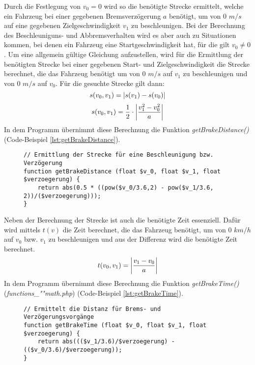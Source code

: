 Durch die Festlegung von $v_{0} = 0$ wird so die benötigte Strecke ermittelt, welche ein Fahrzeug bei einer gegebenen Bremsverzögerung $a$ benötigt, um von 0 $m/s$ auf eine gegebenen Zielgeschwindigkeit $v_{1}$ zu beschleunigen. Bei der Berechnung des Beschleuniguns- und Abbremsverhalten wird es aber auch zu Situationen kommen, bei denen ein Fahrzeug eine Startgeschwindigkeit hat, für die gilt $v_{0} \neq 0$. Um eine allgemein gültige Gleichung aufzustellen, wird für die Ermittlung der benötigten Strecke bei einer gegebenen Start- und Zielgeschwindigkeit die Strecke berechnet, die das Fahrzeug benötigt um von 0 $m/s$ auf $v_{1}$ zu beschleunigen und von 0 $m/s$ auf $v_{0}$. Für die gesuchte Strecke gilt dann: 
\begin{equation}
s(v_{0}, v_{1}) = \left\vert s(v_{1}) - s(v_{0})\right\vert 
\end{equation}
\begin{equation}
\label{eq:s_v_ges}
s(v_{0}, v_{1}) =\frac{1}{2} \cdot\left\vert\frac{v_{1}^{2} - v_{0}^{2}}{a}\right\vert
\end{equation}
In dem Programm übernimmt diese Berechnung die Funktion \textit{getBrakeDistance()} (Code-Beispiel \ref{lst:getBrakeDistance}). 
\begin{figure}[H]
\begin{lstlisting}[caption={\textit{getBrakeDistance$($$)$} (\textit{functions\_math.php})},captionpos=b,label={lst:getBrakeDistance}]
// Ermittlung der Strecke für eine Beschleunigung bzw. Verzögerung
function getBrakeDistance (float $v_0, float $v_1, float $verzoegerung) {
	return abs(0.5 * ((pow($v_0/3.6,2) - pow($v_1/3.6, 2))/($verzoegerung)));
}
\end{lstlisting}
\end{figure}
Neben der Berechnung der Strecke ist auch die benötigte Zeit essenziell. Dafür wird mittels $t(v)$ die Zeit berechnet, die das Fahrzeug benötigt, um von 0 $km/h$ auf $v_{0}$ bzw. $v_{1}$ zu beschleunigen und aus der Differenz wird die benötigte Zeit berechnet.
\begin{equation}
\label{eq:t_v_ges}
t(v_{0}, v_{1}) = \left\vert\frac{v_{1} - v_{0}}{a}\right\vert
\end{equation}
In dem Programm übernimmt diese Berechnung die Funktion \textit{getBrakeTime()} (\textit{func\-tions\_""math\-.php}) (Code-Beispiel \ref{lst:getBrakeTime}).
\begin{figure}[H]
\begin{lstlisting}[caption={\textit{getBrakeTime$($$)$} (\textit{functions\_math.php})},captionpos=b,label={lst:getBrakeTime}]
// Ermittelt die Distanz für Brems- und Verzögerungsvorgänge
function getBrakeTime (float $v_0, float $v_1, float $verzoegerung) {
	return abs((($v_1/3.6)/$verzoegerung) - (($v_0/3.6)/$verzoegerung));
}
\end{lstlisting}
\end{figure}
